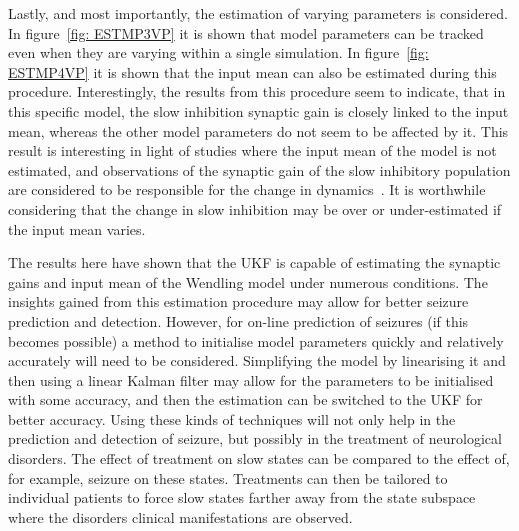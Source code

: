 Lastly, and most importantly, the estimation of varying parameters is considered. In figure~\ref{fig: ESTMP3VP} it is shown that model parameters can be tracked even when they are varying within a single simulation. In figure~\ref{fig: ESTMP4VP} it is shown that the input mean can also be estimated during this procedure. Interestingly, the results from this procedure seem to indicate, that in this specific model, the slow inhibition synaptic gain is closely linked to the input mean, whereas the other model parameters do not seem to be affected by it. This result is interesting in light of studies where the input mean of the model is not estimated, and observations of the synaptic gain of the slow inhibitory population are considered to be responsible for the change in dynamics~\citep{wendling2005interictal}. It is worthwhile considering that the change in slow inhibition may be over or under-estimated if the input mean varies.

The results here have shown that the UKF is capable of estimating the synaptic gains and input mean of the Wendling model under numerous conditions. The insights gained from this estimation procedure may allow for better seizure prediction and detection. However, for on-line prediction of seizures (if this becomes possible) a method to initialise model parameters quickly and relatively accurately will need to be considered. Simplifying the model by linearising it and then using a linear Kalman  filter may allow for the parameters to be initialised with some accuracy, and then the estimation can be switched to the UKF for better accuracy. Using these kinds of techniques will not only help in the prediction and detection of seizure, but possibly in the treatment of neurological disorders. The effect of treatment on slow states can be compared to the effect of, for example, seizure on these states. Treatments can then be tailored to individual patients to force slow states farther away from the state subspace where the disorders clinical manifestations are observed.




